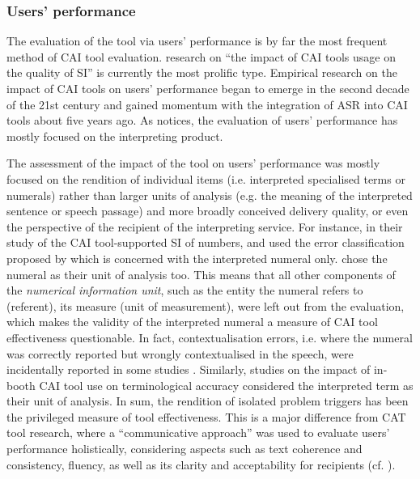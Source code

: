 \subsubsection{Users’ performance}

The evaluation of the tool via users’ performance is by far the most frequent method of CAI tool evaluation.  research on ``the impact of CAI tools usage on the quality of SI'' is currently the most prolific type. Empirical research on the impact of CAI tools on users’ performance began to emerge in the second decade of the 21st century and gained momentum with the integration of ASR into CAI tools about five years ago. As \citet[87]{prandi2022b} notices, the evaluation of users’ performance has mostly focused on the interpreting product.

The assessment of the impact of the tool on users’ performance was mostly focused on the rendition of individual items (i.e. interpreted specialised terms or numerals) rather than larger units of analysis (e.g. the meaning of the interpreted sentence or speech passage) and more broadly conceived delivery quality, or even the perspective of the recipient of the interpreting service. For instance, in their study of the CAI tool-supported SI of numbers, \citet{desmet2018simultaneous} and \citet{pisani2021measuring} used the error classification proposed by \citet{braun1996inacuracy} which is concerned with the interpreted numeral only. \citet{defrancq2021automatic} chose the numeral as their unit of analysis too. This means that all other components of the \textit{numerical information unit}, such as the entity the numeral refers to (referent), its measure (unit of measurement), were left out from the evaluation, which makes the validity of the interpreted numeral a measure of CAI tool effectiveness questionable. In fact, contextualisation errors, i.e. where the numeral was correctly reported but wrongly contextualised in the speech, were incidentally reported in some studies \citep{canali2019technologie,pisani2021measuring}. Similarly, studies on the impact of in-booth CAI tool use on terminological accuracy considered the interpreted term as their unit of analysis. In sum, the rendition of isolated problem triggers has been the privileged measure of tool effectiveness. This is a major difference from CAT tool research, where a ``communicative approach'' was used to evaluate users’ performance holistically, considering aspects such as text coherence and consistency, fluency, as well as its clarity and acceptability for recipients (cf. ).

